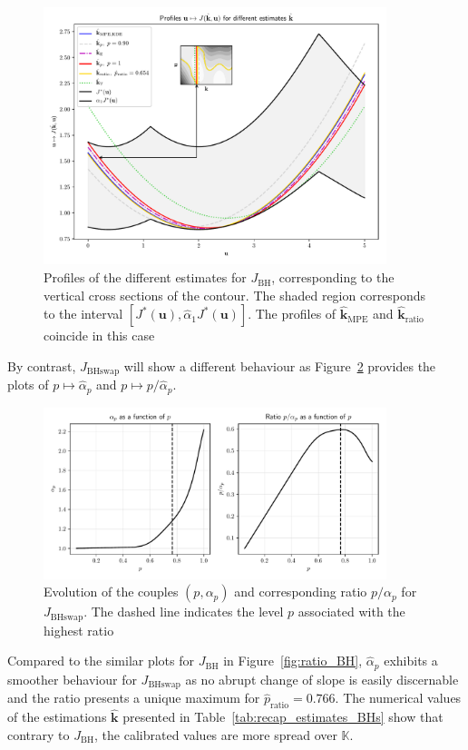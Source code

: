 \documentclass[preprint, 1p]{elsarticle}
\newcommand{\kest}{\hat{\mathbf{k}}}
\newcommand{\checkap}{{\alpha}_p}
\newcommand{\checka}{{\alpha}}
\newcommand{\Kspace}{\mathbb{K}}
\newcommand{\JBHS}{J_{\mathrm{BHswap}}}
\begin{document}
\begin{figure}[!h]
  \centering
\includegraphics[width=10cm]{Figures/profile_BH.pdf}
\caption{Profiles of the different estimates for $J_{\mathrm{BH}}$, corresponding to the vertical cross sections of the contour. The shaded region corresponds to the interval $[J^*(\mathbf{u}), \hat{\checka}_1 J^*(\mathbf{u})]$. The profiles of $\kest_{\mathrm{MPE}}$ and $\kest_{\mathrm{ratio}}$ coincide in this case}
\label{fig:profiles_branin}
\end{figure}
By contrast, $\JBHS$ will show a different behaviour as Figure~\ref{fig:ratio_BHs} provides the plots of $p\mapsto \hat{\checka}_p$ and $p\mapsto p/\hat{\checka}_p$.

\begin{figure}[ht]
  \centering
\includegraphics[width=10cm]{Figures/alpha_p_BHs.pdf}
\caption{Evolution of the couples $(p,\checkap)$ and corresponding ratio $p/\checkap$ for $J_{\mathrm{BHswap}}$. The dashed line indicates the level $p$ associated with the highest ratio}
\label{fig:ratio_BHs}
\end{figure}

Compared to the similar plots for $J_{\mathrm{BH}}$ in Figure~\ref{fig:ratio_BH}, $\hat{\checka}_p$ exhibits a smoother behaviour for $\JBHS$ as no abrupt change of slope is easily discernable and the ratio presents a unique maximum for $\hat{p}_{\mathrm{ratio}}=0.766$. The numerical values of the estimations $\kest$ presented in Table~\ref{tab:recap_estimates_BHs} show that contrary to $J_{\mathrm{BH}}$, the calibrated values are more spread over $\Kspace$.
\end{document}
